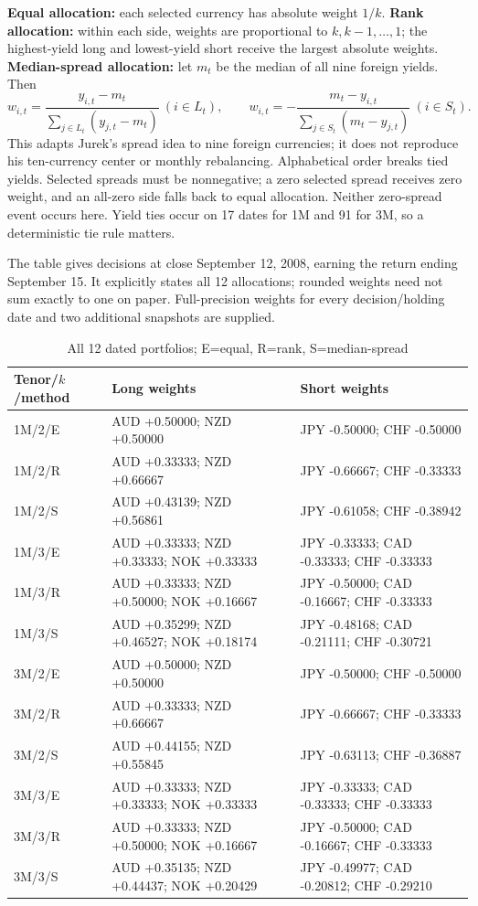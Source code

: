 \documentclass[10pt,letterpaper]{article}
\begin{document}
\textbf{Equal allocation:} each selected currency has absolute weight $1/k$.
\textbf{Rank allocation:} within each side, weights are proportional to $k,k-1,\ldots,1$;
the highest-yield long and lowest-yield short receive the largest absolute weights.
\textbf{Median-spread allocation:} let $m_t$ be the median of all nine foreign yields. Then
\[
w_{i,t}=\frac{y_{i,t}-m_t}{\sum_{j\in L_t}(y_{j,t}-m_t)}\ (i\in L_t),\qquad
w_{i,t}=-\frac{m_t-y_{i,t}}{\sum_{j\in S_t}(m_t-y_{j,t})}\ (i\in S_t).
\]
This adapts Jurek's spread idea to nine foreign currencies; it does not reproduce his
ten-currency center or monthly rebalancing. Alphabetical order breaks tied yields.
Selected spreads must be nonnegative; a zero selected spread receives zero weight,
and an all-zero side falls back to equal allocation. Neither zero-spread event occurs here.
Yield ties occur on 17 dates for 1M and 91 for 3M, so a deterministic tie rule matters.

The table gives decisions at close September 12, 2008, earning the return ending September 15.
It explicitly states all 12 allocations; rounded weights need not sum exactly to one on paper.
Full-precision weights for every decision/holding date and two additional snapshots are supplied.
\begin{table}[H]\centering\small\caption{All 12 dated portfolios; E=equal, R=rank, S=median-spread}\begin{tabular}{l >{\raggedright\arraybackslash}p{5.8cm} >{\raggedright\arraybackslash}p{5.8cm}}\toprule Tenor/$k$/method & Long weights & Short weights\\\midrule
1M/2/E & AUD +0.50000; NZD +0.50000 & JPY -0.50000; CHF -0.50000\\[4pt]
1M/2/R & AUD +0.33333; NZD +0.66667 & JPY -0.66667; CHF -0.33333\\[4pt]
1M/2/S & AUD +0.43139; NZD +0.56861 & JPY -0.61058; CHF -0.38942\\[4pt]
1M/3/E & AUD +0.33333; NZD +0.33333; NOK +0.33333 & JPY -0.33333; CAD -0.33333; CHF -0.33333\\[4pt]
1M/3/R & AUD +0.33333; NZD +0.50000; NOK +0.16667 & JPY -0.50000; CAD -0.16667; CHF -0.33333\\[4pt]
1M/3/S & AUD +0.35299; NZD +0.46527; NOK +0.18174 & JPY -0.48168; CAD -0.21111; CHF -0.30721\\[4pt]
3M/2/E & AUD +0.50000; NZD +0.50000 & JPY -0.50000; CHF -0.50000\\[4pt]
3M/2/R & AUD +0.33333; NZD +0.66667 & JPY -0.66667; CHF -0.33333\\[4pt]
3M/2/S & AUD +0.44155; NZD +0.55845 & JPY -0.63113; CHF -0.36887\\[4pt]
3M/3/E & AUD +0.33333; NZD +0.33333; NOK +0.33333 & JPY -0.33333; CAD -0.33333; CHF -0.33333\\[4pt]
3M/3/R & AUD +0.33333; NZD +0.50000; NOK +0.16667 & JPY -0.50000; CAD -0.16667; CHF -0.33333\\[4pt]
3M/3/S & AUD +0.35135; NZD +0.44437; NOK +0.20429 & JPY -0.49977; CAD -0.20812; CHF -0.29210\\[4pt]
\bottomrule\end{tabular}\end{table}
\end{document}
